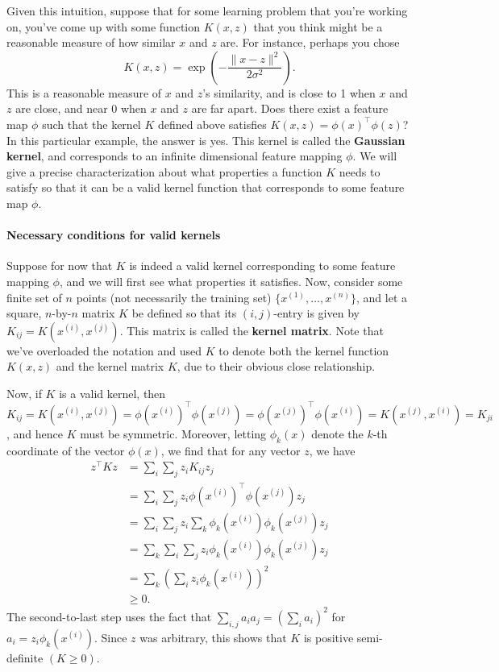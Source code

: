Given this intuition, suppose that for some learning problem that you're
working on, you've come up with some function $K(x,z)$ that you think might
be a reasonable measure of how similar $x$ and $z$ are. For instance, perhaps
you chose
\begin{equation*}
    K(x,z) = \exp\left(-\frac{\lVert x - z \rVert^2}{2\sigma^2}\right).    
\end{equation*}
This is a reasonable measure of $x$ and $z$'s similarity, and is close to 1 when
$x$ and $z$ are close, and near 0 when $x$ and $z$ are far apart. Does there exist
a feature map $\phi$ such that the kernel $K$ defined above satisfies $K(x,z) =
\phi(x)^\top \phi(z)$? In this particular example, the answer is yes. This kernel is called
the \textbf{Gaussian kernel}, and corresponds to an infinite dimensional feature
mapping $\phi$. We will give a precise characterization about what properties
a function $K$ needs to satisfy so that it can be a valid kernel function that
corresponds to some feature map $\phi$.

\paragraph{Necessary conditions for valid kernels} Suppose for now that $K$ is
indeed a valid kernel corresponding to some feature mapping $\phi$, and we will
first see what properties it satisfies. Now, consider some finite set of $n$ points
(not necessarily the training set) $\{x^{(1)} ,\ldots ,x^{(n)} \}$, and let a square, $n$-by-$n$
matrix $K$ be defined so that its $(i,j)$-entry is given by $K_{ij} = K(x^{(i)}, x^{(j)})$.
This matrix is called the \textbf{kernel matrix}. Note that we've overloaded the
notation and used $K$ to denote both the kernel function $K(x,z)$ and the
kernel matrix $K$, due to their obvious close relationship.

Now, if $K$ is a valid kernel, then $K_{ij} = K(x^{(i)} ,x^{(j)} ) = \phi(x^{(i)} )^\top \phi(x^{(j)} ) =
\phi(x^{(j)} )^\top \phi(x^{(i)} ) = K(x^{(j)} ,x^{(i)} ) = K_{ji}$ , and hence $K$ must be symmetric. Moreover,
letting $\phi_k (x)$ denote the $k$-th coordinate of the vector $\phi(x)$, we find that
for any vector $z$, we have
\begin{align*}
    z^\top K z &= \sum_i \sum_j z_i K_{ij} z_j\\
    &= \sum_i \sum_j z_i \phi(x^{(i)} )^\top \phi(x^{(j)} )z_j\\
    &= \sum_i \sum_j z_i \sum_k \phi_k (x^{(i)} )\phi_k (x^{(j)} )z_j\\
    &= \sum_k \sum_i \sum_j z_i \phi_k (x^{(i)} )\phi_k (x^{(j)} )z_j\\
    &= \sum_k \left( \sum_i z_i \phi_k (x^{(i)} ) \right)^2\\
    &\ge 0.
\end{align*}
The second-to-last step uses the fact that $\sum_{i,j} a_i a_j = ( \sum_i a_i)^2$ for $a_i =
z_i \phi_k (x^{(i)})$. Since $z$ was arbitrary, this shows that $K$ is positive semi-definite
$(K \ge 0)$.

